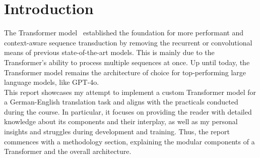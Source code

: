 \section{Introduction}

The Transformer model~\cite{vaswani2017attention} established the foundation for more performant and context-aware sequence transduction by removing the recurrent or convolutional means of previous state-of-the-art models.
This is mainly due to the Transformer's ability to process multiple sequences at once.
Up until today, the Transformer model remains the architecture of choice for top-performing large language models, like GPT-4o. \\
This report showcases my attempt to implement a custom Transformer model for a German-English translation task and aligns with the practicals conducted during the course.
In particular, it focuses on providing the reader with detailed knowledge about its components and their interplay, as well as my personal insights and struggles during development and training.
Thus, the report commences with a methodology section, explaining the modular components of a Transformer and the overall architecture.
